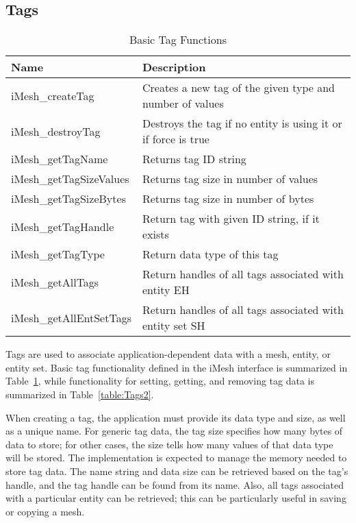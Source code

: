 \subsection{Tags\label{sub:Tag-Interface}}

%
\begin{table}

\caption{Basic Tag Functions}

\label{table:Tags} \begin{tabular}{|p{1.25in}|p{223pt}|}
\hline 
{\small Name}&
{\small Description}\tabularnewline
\hline
\hline 
{\small iMesh\_createTag}&
{\small Creates a new tag of the given type and number of values}\tabularnewline
\hline 
{\small iMesh\_destroyTag}&
{\small Destroys the tag if no entity is using it or if force is true}\tabularnewline
\hline
\hline 
{\small iMesh\_getTagName}&
{\small Returns tag ID string}\tabularnewline
\hline 
{\small iMesh\_getTagSizeValues}&
{\small Returns tag size in number of values}\tabularnewline
\hline 
{\small iMesh\_getTagSizeBytes}&
{\small Returns tag size in number of bytes}\tabularnewline
\hline 
{\small iMesh\_getTagHandle}&
{\small Return tag with given ID string, if it exists}\tabularnewline
\hline 
{\small iMesh\_getTagType}&
{\small Return data type of this tag}\tabularnewline
\hline
\hline 
{\small iMesh\_getAllTags}&
{\small Return handles of all tags associated with entity EH}\tabularnewline
\hline 
{\small iMesh\_getAllEntSetTags}&
{\small Return handles of all tags associated with entity set SH}\tabularnewline
\hline
\end{tabular}
\end{table}


Tags are used to associate application-dependent data with a mesh,
entity, or entity set. Basic tag functionality defined in the iMesh
interface is summarized in Table~\ref{table:Tags}, while functionality
for setting, getting, and removing tag data is summarized in Table~\ref{table:Tags2}.

When creating a tag, the application must provide its data type and
size, as well as a unique name. For generic tag data, the tag size
specifies how many bytes of data to store; for other cases, the size
tells how many values of that data type will be stored. The implementation
is expected to manage the memory needed to store tag data. The name
string and data size can be retrieved based on the tag's handle, and
the tag handle can be found from its name. Also, all tags associated
with a particular entity can be retrieved; this can be particularly
useful in saving or copying a mesh.

